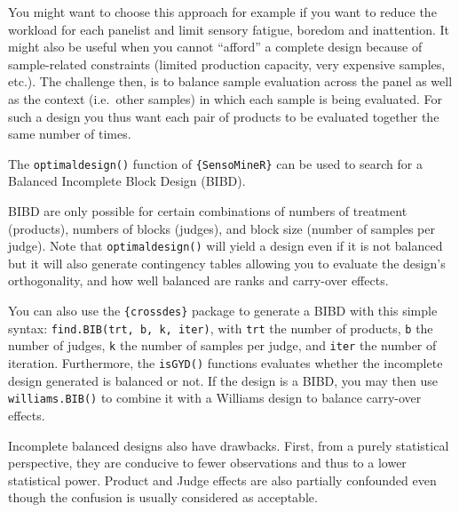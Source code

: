 \documentclass[
]{book}
\newenvironment{Shaded}{\begin{snugshade}}{\end{snugshade}}
\newcommand{\AttributeTok}[1]{\textcolor[rgb]{0.77,0.63,0.00}{#1}}
\newcommand{\DecValTok}[1]{\textcolor[rgb]{0.00,0.00,0.81}{#1}}
\newcommand{\FunctionTok}[1]{\textcolor[rgb]{0.00,0.00,0.00}{#1}}
\newcommand{\NormalTok}[1]{#1}
\newcommand{\OtherTok}[1]{\textcolor[rgb]{0.56,0.35,0.01}{#1}}
\newcommand{\SpecialCharTok}[1]{\textcolor[rgb]{0.00,0.00,0.00}{#1}}
\begin{document}
You might want to choose this approach for example if you want to reduce the workload for each panelist and limit sensory fatigue, boredom and inattention. It might also be useful when you cannot ``afford'' a complete design because of sample-related constraints (limited production capacity, very expensive samples, etc.). The challenge then, is to balance sample evaluation across the panel as well as the context (i.e.~other samples) in which each sample is being evaluated. For such a design you thus want each pair of products to be evaluated together the same number of times.

The \texttt{optimaldesign()} function of \texttt{\{SensoMineR\}} can be used to search for a Balanced Incomplete Block Design (BIBD).

\begin{Shaded}
\end{Shaded}

BIBD are only possible for certain combinations of numbers of treatment (products), numbers of blocks (judges), and block size (number of samples per judge). Note that \texttt{optimaldesign()} will yield a design even if it is not balanced but it will also generate contingency tables allowing you to evaluate the design's orthogonality, and how well balanced are ranks and carry-over effects.

You can also use the \texttt{\{crossdes\}} package to generate a BIBD with this simple syntax: \texttt{find.BIB(trt,\ b,\ k,\ iter)}, with \texttt{trt} the number of products, \texttt{b} the number of judges, \texttt{k} the number of samples per judge, and \texttt{iter} the number of iteration. Furthermore, the \texttt{isGYD()} functions evaluates whether the incomplete design generated is balanced or not. If the design is a BIBD, you may then use \texttt{williams.BIB()} to combine it with a Williams design to balance carry-over effects.

Incomplete balanced designs also have drawbacks. First, from a purely statistical perspective, they are conducive to fewer observations and thus to a lower statistical power. Product and Judge effects are also partially confounded even though the confusion is usually considered as acceptable.
\end{document}
